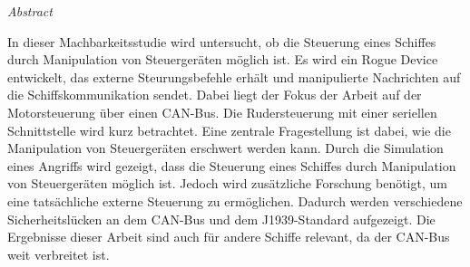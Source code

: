 \clearpage
{\normalfont
\color{uniblau}
\huge\sffamily\itshape
Abstract
}

In dieser Machbarkeitsstudie wird untersucht, ob die Steuerung eines Schiffes durch Manipulation von Steuergeräten möglich ist.
Es wird ein Rogue Device entwickelt, das externe Steurungsbefehle erhält und manipulierte Nachrichten auf die Schiffskommunikation sendet.
Dabei liegt der Fokus der Arbeit auf der Motorsteuerung über einen CAN-Bus. Die Rudersteuerung mit einer seriellen Schnittstelle wird kurz betrachtet.
Eine zentrale Fragestellung ist dabei, wie die Manipulation von Steuergeräten erschwert werden kann.
Durch die Simulation eines Angriffs wird gezeigt, dass die Steuerung eines Schiffes durch Manipulation von Steuergeräten möglich ist.
Jedoch wird zusätzliche Forschung benötigt, um eine tatsächliche externe Steuerung zu ermöglichen.
Dadurch werden verschiedene Sicherheitslücken an dem CAN-Bus und dem J1939-Standard aufgezeigt.
Die Ergebnisse dieser Arbeit sind auch für andere Schiffe relevant, da der CAN-Bus weit verbreitet ist.

\vfill